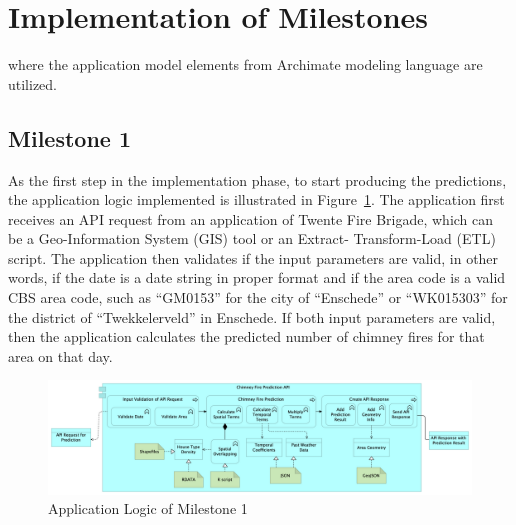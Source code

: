 \documentclass{utitcphd_overleaf}
\begin{document}



\section{Implementation of Milestones}

where the application model elements from Archimate modeling language are utilized.

\subsection{Milestone 1}

As the first step in the implementation phase, to start producing the predictions, the application logic implemented is illustrated in Figure~\ref{fig:m1_logic}. The application first receives an API request from an application of Twente Fire Brigade, which can be a Geo-Information System (GIS) tool or an Extract- Transform-Load (ETL) script. The application then validates if the input parameters are valid, in other words, if the date is a date string in proper format and if the area code is a valid CBS area code, such as “GM0153” for the city of “Enschede” or “WK015303” for the district of “Twekkelerveld” in Enschede. If both input parameters are valid, then the application calculates the predicted number of chimney fires for that area on that day.

\begin{figure}[ht]
  \centering
  \includegraphics[width=1\textwidth]{my_images/milestones/m1.png}
  \caption{Application Logic of Milestone 1}
  \label{fig:m1_logic}
\end{figure}
\end{document}
